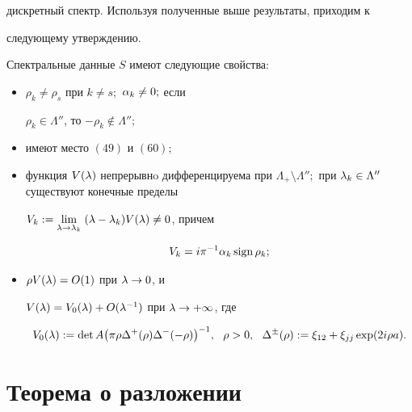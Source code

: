 дискретный спектр. Используя полученные выше результаты, приходим к


следующему утверждению.





\begin{thm}


Спектральные данные $S$ имеют следующие свойства\/${:}$


\begin{itemize}


\item[(i${}_1$)] $\rho_k\ne\rho_s$ при $k\ne s;$ $\alpha_k\ne 0;$ если


$\rho_k\in\Lambda''$, то $-\rho_k\notin\Lambda'';$


\item[(i${}_2$)] имеют место $(49)$ и $(60);$


\item[(i${}_3$)] функция $V(\la)$ непрерывнo дифференцируема при $\Lambda_{+}


\setminus\Lambda'';$ при $\la_k\in\Lambda''$ существуют конечные пределы


$V_k:= \lim\limits_{\lambda\to\lambda_k}\; (\lambda-\lambda_k)V(\lambda)\ne 0$, причем


$$


V_k=i\pi^{-1}\al_k\,\mathrm{sign}\,\rho_k;


$$


\item[(i${}_4$)] $\rho V(\lambda)=O(1)$ при $\lambda\to 0$, и


$V(\lambda)=V_0(\lambda)+O(\lambda^{-1})$ при $\lambda\to +\infty$, где


$$


V_0(\la):=\det A\big(\pi\rho\Delta^{+}(\rho)\Delta^{-}(-\rho)\big)^{-1},


\ \ \rho >0,\ \ \Delta^{\pm}(\rho):=\xi_{12}+\xi_{jj}\exp(2i\rho a).


$$


\end{itemize}


\end{thm}





\section{Теорема о разложении}





